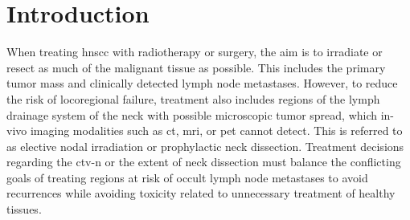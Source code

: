 \documentclass[twocolumn]{aastex631}
\begin{document}
\begin{abstract}
\end{abstract}


\section{Introduction}
\label{sec:intro}

When treating \gls{hnscc} with radiotherapy or surgery, the aim is to irradiate or resect as much of the malignant tissue as possible. This includes the primary tumor mass and clinically detected lymph node metastases. However, to reduce the risk of locoregional failure, treatment also includes regions of the lymph drainage system of the neck with possible microscopic tumor spread, which in-vivo imaging modalities such as \gls{ct}, \gls{mri}, or \gls{pet} cannot detect. This is referred to as elective nodal irradiation or prophylactic neck dissection. Treatment decisions regarding the \gls{ctv-n} or the extent of neck dissection must balance the conflicting goals of treating regions at risk of occult lymph node metastases to avoid recurrences while avoiding toxicity related to unnecessary treatment of healthy tissues.
\end{document}
